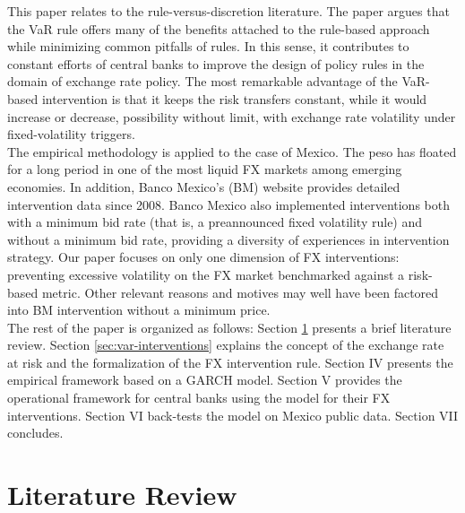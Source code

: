 \documentclass[11pt]{article}
\begin{document}
This paper relates to the  rule-versus-discretion literature. The paper argues
that  the VaR  rule offers  many of  the benefits  attached to  the rule-based
approach  while  minimizing common  pitfalls  of  rules.   In this  sense,  it
contributes to  constant efforts  of central  banks to  improve the  design of
policy rules  \citep{taylor2017} in the  domain of exchange rate  policy.  The
most remarkable advantage  of the VaR-based intervention is that  it keeps the
risk  transfers constant,  while it  would increase  or decrease,  possibility
without   limit,  with   exchange  rate   volatility  under   fixed-volatility
triggers.\\

The  empirical methodology  is applied  to the  case of  Mexico. The  peso has
floated for a long period in one  of the most liquid FX markets among emerging
economies.  In  addition,  Banco   Mexico's  (BM)  website  provides  detailed
intervention data since 2008. Banco Mexico also implemented interventions both
with a  minimum bid rate (that  is, a preannounced fixed  volatility rule) and
without  a  minimum  bid  rate,   providing  a  diversity  of  experiences  in
intervention  strategy.  Our  paper  focuses  on  only  one  dimension  of  FX
interventions: preventing  excessive volatility  on the FX  market benchmarked
against a risk-based metric. Other relevant  reasons and motives may well have
been factored into BM intervention without a minimum price.\\

The rest  of the paper  is organized as follows:  Section \ref{sec:literature}
presents  a  brief  literature  review.   Section  \ref{sec:var-interventions}
explains the concept of the exchange rate at risk and the formalization of the
FX intervention rule.  Section IV presents the empirical framework  based on a
GARCH model.  Section  V provides the operational framework  for central banks
using the model for their FX interventions. Section VI back-tests the model on
Mexico public data. Section VII concludes.\\

\section{Literature Review}
\label{sec:literature}
\end{document}
